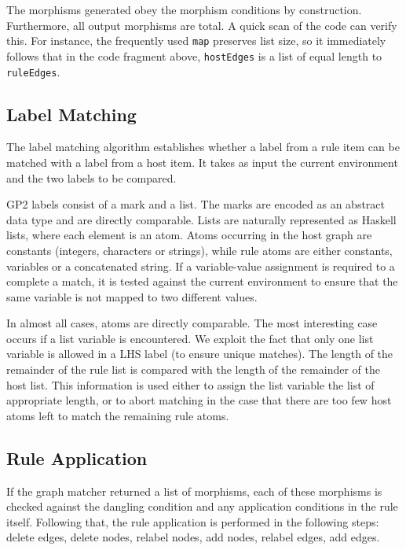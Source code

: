 The morphisms generated obey the morphism conditions by construction. Furthermore, all output morphisms are total. A quick scan of the code can verify this. For instance, the frequently used \texttt{map} preserves list size, so it immediately follows that in the code fragment above, \texttt{hostEdges} is a list of equal length to \texttt{ruleEdges}. 


\subsection{Label Matching}

The label matching algorithm establishes whether a label from a rule item can be matched with a label from a host item. It takes as input the current environment and the two labels to be compared. 

GP2 labels consist of a mark and a list. The marks are encoded as an abstract data type and are directly comparable. Lists are naturally represented as Haskell lists, where each element is an atom. Atoms occurring in the host graph are constants (integers, characters or strings), while rule atoms are either constants, variables or a concatenated string. If a variable-value assignment is required to a complete a match, it is tested against the current environment to ensure that the same variable is not mapped to two different values. 

In almost all cases, atoms are directly comparable. The most interesting case occurs if a list variable is encountered. We exploit the fact that only one list variable is allowed in a LHS label (to ensure unique matches). The length of the remainder of the rule list is compared with the length of the remainder of the host list. This information is used either to assign the list variable the list of appropriate length, or to abort matching in the case that there are too few host atoms left to match the remaining rule atoms.

\subsection{Rule Application}

If the graph matcher returned a list of morphisms, each of these morphisms is checked against the dangling condition and any application conditions in the rule itself. Following that, the rule application is performed in the following steps: delete edges, delete nodes, relabel nodes, add nodes, relabel edges, add edges. 

